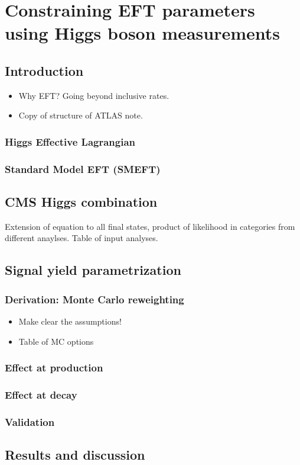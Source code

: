 \chapter{Constraining EFT parameters using Higgs boson measurements}
\label{chap:eft}

\section{Introduction}
\begin{itemize}
    \item Why EFT? Going beyond inclusive rates.
    \item Copy of structure of ATLAS note.
\end{itemize}

\subsection{Higgs Effective Lagrangian}

\subsection{Standard Model EFT (SMEFT)}

\section{CMS Higgs combination}
Extension of equation to all final states, product of likelihood in categories from different anaylses. Table of input analyses.

\section{Signal yield parametrization}

\subsection{Derivation: Monte Carlo reweighting}
\begin{itemize}
    \item Make clear the assumptions!
    \item Table of MC options
\end{itemize}
\subsection{Effect at production}

\subsection{Effect at decay}

\subsection{Validation}

\section{Results and discussion}
